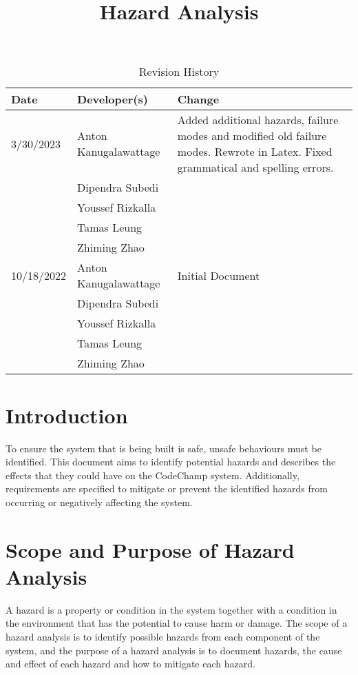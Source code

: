 \documentclass{article}
\title{Hazard Analysis\\\progname}
\author{\authname}
\date{}
\begin{document}
\maketitle

\begin{table}[hp]
\caption{Revision History} \label{TblRevisionHistory}
\begin{tabularx}{\textwidth}{llX}
\toprule
\textbf{Date} & \textbf{Developer(s)} & \textbf{Change}\\
\midrule
3/30/2023 & Anton Kanugalawattage & Added additional hazards, failure modes and modified old failure modes. Rewrote in Latex. Fixed grammatical and spelling errors. \\
  & Dipendra Subedi & \\
  & Youssef Rizkalla &\\
  & Tamas Leung & \\
  & Zhiming Zhao & \\
\midrule
10/18/2022 & Anton Kanugalawattage & Initial Document\\
  & Dipendra Subedi & \\
  & Youssef Rizkalla &\\
  & Tamas Leung & \\
  & Zhiming Zhao & \\
\bottomrule
\end{tabularx}
\end{table}

\newpage
\tableofcontents
\listoftables
\listoffigures

\newpage
\section{Introduction}
To ensure the system that is being built is safe, unsafe behaviours must be identified. This document aims to identify potential hazards and describes the effects that they could have on the CodeChamp system. Additionally, requirements are specified to mitigate or prevent the identified hazards from occurring or negatively affecting the system. 

\section{Scope and Purpose of Hazard Analysis}
A hazard is a property or condition in the system together with a condition in the environment that has the potential to cause harm or damage. The scope of a hazard analysis is to identify possible hazards from each component of the system, and the purpose of a hazard analysis is to document hazards, the cause and effect of each hazard and how to mitigate each hazard.
\end{document}
